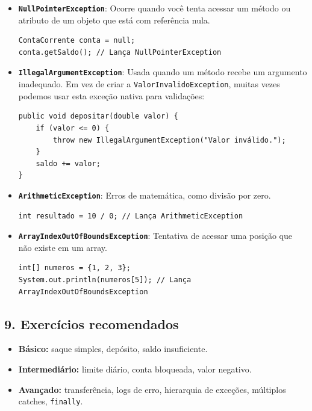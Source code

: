 \documentclass[12pt,a4paper]{article}
\begin{document}
\begin{itemize}
    \item \textbf{\texttt{NullPointerException}}: Ocorre quando você tenta acessar um método ou atributo de um objeto que está com referência nula.
\begin{lstlisting}
ContaCorrente conta = null;
conta.getSaldo(); // Lança NullPointerException
\end{lstlisting}

    \item \textbf{\texttt{IllegalArgumentException}}: Usada quando um método recebe um argumento inadequado. Em vez de criar a \texttt{ValorInvalidoException}, muitas vezes podemos usar esta exceção nativa para validações:
\begin{lstlisting}
public void depositar(double valor) {
    if (valor <= 0) {
        throw new IllegalArgumentException("Valor inválido.");
    }
    saldo += valor;
}
\end{lstlisting}

    \item \textbf{\texttt{ArithmeticException}}: Erros de matemática, como divisão por zero.
\begin{lstlisting}
int resultado = 10 / 0; // Lança ArithmeticException
\end{lstlisting}

    \item \textbf{\texttt{ArrayIndexOutOfBoundsException}}: Tentativa de acessar uma posição que não existe em um array.
\begin{lstlisting}
int[] numeros = {1, 2, 3};
System.out.println(numeros[5]); // Lança ArrayIndexOutOfBoundsException
\end{lstlisting}
\end{itemize}

\subsection*{9. Exercícios recomendados}
\begin{itemize}
    \item \textbf{Básico:} saque simples, depósito, saldo insuficiente.
    \item \textbf{Intermediário:} limite diário, conta bloqueada, valor negativo.
    \item \textbf{Avançado:} transferência, logs de erro, hierarquia de exceções, múltiplos catches, \texttt{finally}.
\end{itemize}
\end{document}
